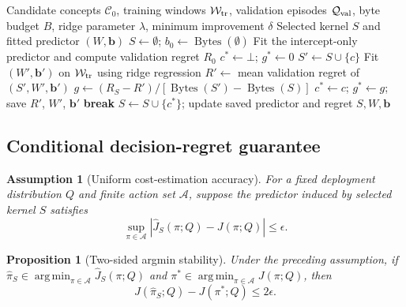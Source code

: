 \documentclass[a4paper,preprint,review,12pt,authoryear]{elsarticle}
\newtheorem{proposition}{Proposition}
\newtheorem{assumption}{Assumption}
\newcommand{\Ccal}{\mathcal{C}}
\newcommand{\Wcal}{\mathcal{W}}
\newcommand{\PiSet}{\mathcal{A}}
\newcommand{\Bytes}{\operatorname{Bytes}}
\newcommand{\argmin}{\operatorname*{arg\,min}}
\begin{document}
\begin{algorithm}[t]
\caption{Budgeted DPCK forward selection}
\label{alg:dpck}
\begin{algorithmic}[1]
\Require Candidate concepts $\Ccal_0$, training windows $\Wcal_{\rm tr}$, validation episodes $\mathcal Q_{\rm val}$, byte budget $B$, ridge parameter $\lambda$, minimum improvement $\delta$
\Ensure Selected kernel $S$ and fitted predictor $(W,\bm b)$
\State $S\gets\emptyset$; $b_0\gets\Bytes(\emptyset)$
\State Fit the intercept-only predictor and compute validation regret $R_0$
  \State $c^*\gets\bot$; $g^*\gets 0$
  \ForAll{$c\in\Ccal_0\setminus S$}
    \State $S'\gets S\cup\{c\}$
    \If{$\Bytes(S')\le B$}
      \State Fit $(W',\bm b')$ on $\Wcal_{\rm tr}$ using ridge regression
      \State $R'\gets$ mean validation regret of $(S',W',\bm b')$
      \State $g\gets (R_{S}-R')/[\Bytes(S')-\Bytes(S)]$
       $c^*\gets c$; $g^*\gets g$; save $R'$, $W'$, $\bm b'$ \EndIf
    \EndIf
  \EndFor
   \State \textbf{break} \EndIf
  \State $S\gets S\cup\{c^*\}$; update saved predictor and regret
\EndWhile
\State \Return $S,W,\bm b$
\end{algorithmic}
\end{algorithm}

\subsection{Conditional decision-regret guarantee}

\begin{assumption}[Uniform cost-estimation accuracy]
For a fixed deployment distribution $Q$ and finite action set $\PiSet$, suppose the predictor induced by selected kernel $S$ satisfies
\begin{equation}
 \sup_{\pi\in\PiSet}|\widehat J_S(\pi;Q)-J(\pi;Q)|\le\epsilon.
 \label{eq:uniform}
\end{equation}
\end{assumption}

\begin{proposition}[Two-sided argmin stability]
\label{prop:2eps}
Under the preceding assumption, if $\widehat\pi_S\in\argmin_{\pi\in\PiSet}\widehat J_S(\pi;Q)$ and $\pi^*\in\argmin_{\pi\in\PiSet}J(\pi;Q)$, then
\begin{equation}
 J(\widehat\pi_S;Q)-J(\pi^*;Q)\le 2\epsilon.
\end{equation}
\end{proposition}
\end{document}

